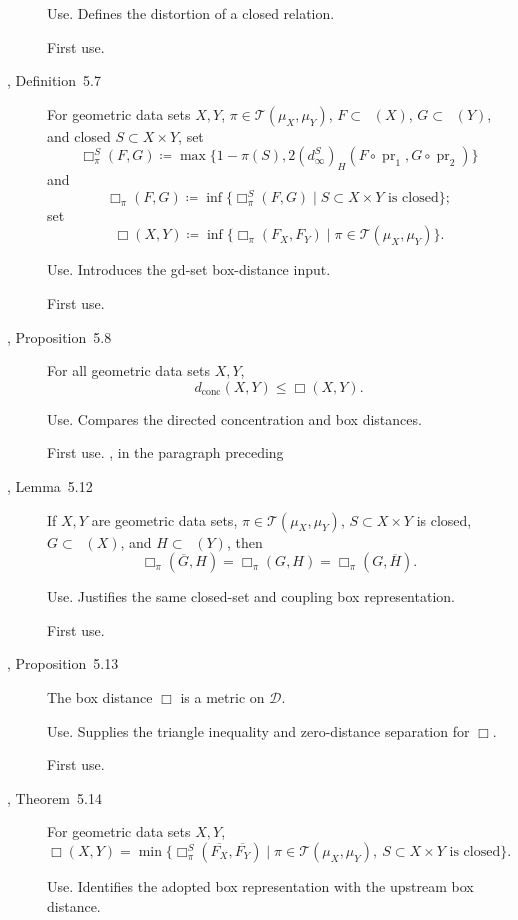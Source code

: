 \documentclass{amsart}
\theoremstyle{plain}
\theoremstyle{definition}
\theoremstyle{remark}
\newcommand{\D}{\mathcal{D}}
\DeclareMathOperator{\lipone}{Lip_1}
\DeclareMathOperator{\pr}{pr}
\newcommand{\dconc}{d_{\operatorname{conc}}}
\newcommand{\dinf}[1]{d^{#1}_{\infty}}
\newcommand{\haus}[1]{\left(#1\right)_H}
\newcommand{\Tplan}{\mathcal{T}}
\begin{document}
\begin{description}
\textup{Use.} Defines the distortion of a closed relation.

\textup{First use.} 

\item[\cite{gds1}, Definition~5.7]
For geometric data sets $X,Y$, $\pi\in\Tplan(\mu_X,\mu_Y)$, $F\subset\lipone(X)$, $G\subset\lipone(Y)$, and closed $S\subset X\times Y$, set
\[\Box^S_\pi(F,G)\coloneqq\max\{1-\pi(S),2\haus{\dinf{S}}(F\circ\pr_1,G\circ\pr_2)\}\]
and
\[\Box_\pi(F,G)\coloneqq\inf\{\Box^S_\pi(F,G)\mid S\subset X\times Y\text{ is closed}\};\]
set
\[\Box(X,Y)\coloneqq\inf\{\Box_\pi(F_X,F_Y)\mid\pi\in\Tplan(\mu_X,\mu_Y)\}.\]

\textup{Use.} Introduces the gd-set box-distance input.

\textup{First use.} 

\item[\cite{gds1}, Proposition~5.8]
For all geometric data sets $X,Y$,
\[\dconc(X,Y)\leq\Box(X,Y).\]

\textup{Use.} Compares the directed concentration and box distances.

\textup{First use.} , in the paragraph preceding 

\item[\cite{gds1}, Lemma~5.12]
If $X,Y$ are geometric data sets, $\pi\in\Tplan(\mu_X,\mu_Y)$, $S\subset X\times Y$ is closed, $G\subset\lipone(X)$, and $H\subset\lipone(Y)$, then
\[\Box_\pi(\overline G,H)=\Box_\pi(G,H)=\Box_\pi(G,\overline H).\]

\textup{Use.} Justifies the same closed-set and coupling box representation.

\textup{First use.} 

\item[\cite{gds1}, Proposition~5.13]
The box distance $\Box$ is a metric on $\D$.

\textup{Use.} Supplies the triangle inequality and zero-distance separation for $\Box$.

\textup{First use.} 

\item[\cite{gds1}, Theorem~5.14]
For geometric data sets $X,Y$,
\[
\Box(X,Y)=\min\{\Box^S_\pi(\overline{F_X},\overline{F_Y})\mid\pi\in\Tplan(\mu_X,\mu_Y),\ S\subset X\times Y\text{ is closed}\}.
\]

\textup{Use.} Identifies the adopted box representation with the upstream box distance.


\end{description}
\end{document}
